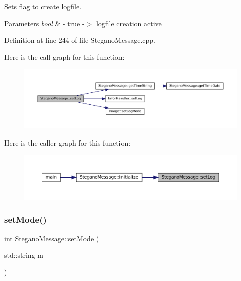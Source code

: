 Sets flag to create logfile. 


\begin{DoxyParams}{Parameters}
{\em bool} & -\/ true -\/$>$ logfile creation active \\
\hline
\end{DoxyParams}


Definition at line 244 of file Stegano\+Message.\+cpp.

Here is the call graph for this function\+:\nopagebreak
\begin{figure}[H]
\begin{center}
\leavevmode
\includegraphics[width=350pt]{classSteganoMessage_a438e9d5189a8e3b83021fada4a6a469c_cgraph}
\end{center}
\end{figure}
Here is the caller graph for this function\+:\nopagebreak
\begin{figure}[H]
\begin{center}
\leavevmode
\includegraphics[width=350pt]{classSteganoMessage_a438e9d5189a8e3b83021fada4a6a469c_icgraph}
\end{center}
\end{figure}
\mbox{\label{classSteganoMessage_a3e06a73baa5744b5eb9152f4ae65f458}} 
\subsubsection{\texorpdfstring{setMode()}{setMode()}}
{\footnotesize\ttfamily int Stegano\+Message\+::set\+Mode (\begin{DoxyParamCaption}\item[{std\+::string}]{m }\end{DoxyParamCaption})}



